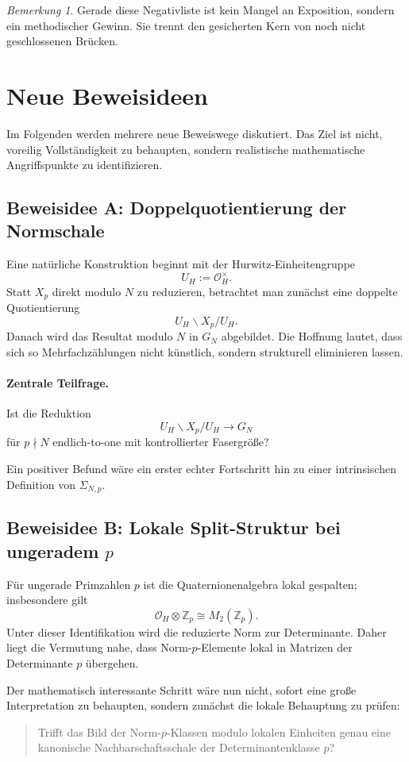 \documentclass[12pt,a4paper]{article}
\theoremstyle{plain}
\theoremstyle{definition}
\theoremstyle{remark}
\newtheorem{bemerkung}[satz]{Bemerkung}
\newcommand{\Z}{\mathbb{Z}}
\newcommand{\OH}{\mathcal{O}_H}
\begin{document}
	\begin{bemerkung}
		Gerade diese Negativliste ist kein Mangel an Exposition, sondern ein methodischer Gewinn. Sie trennt den gesicherten Kern von noch nicht geschlossenen Brücken.
	\end{bemerkung}
	
	\section{Neue Beweisideen}
	Im Folgenden werden mehrere neue Beweiswege diskutiert. Das Ziel ist nicht, voreilig Vollständigkeit zu behaupten, sondern realistische mathematische Angriffspunkte zu identifizieren.
	
	\subsection{Beweisidee A: Doppelquotientierung der Normschale}
	Eine natürliche Konstruktion beginnt mit der Hurwitz-Einheitengruppe
	\[
	U_H:=\OH^\times.
	\]
	Statt $X_p$ direkt modulo $N$ zu reduzieren, betrachtet man zunächst eine doppelte Quotientierung
	\[
	U_H\backslash X_p/U_H.
	\]
	Danach wird das Resultat modulo $N$ in $G_N$ abgebildet. Die Hoffnung lautet, dass sich so Mehrfachzählungen nicht künstlich, sondern strukturell eliminieren lassen.
	
	\paragraph{Zentrale Teilfrage.}
	Ist die Reduktion
	\[
	U_H\backslash X_p/U_H \longrightarrow G_N
	\]
	für $p\nmid N$ endlich-to-one mit kontrollierter Fasergröße?
	
	Ein positiver Befund wäre ein erster echter Fortschritt hin zu einer intrinsischen Definition von $\Sigma_{N,p}$.
	
	\subsection{Beweisidee B: Lokale Split-Struktur bei ungeradem $p$}
	Für ungerade Primzahlen $p$ ist die Quaternionenalgebra lokal gespalten; insbesondere gilt
	\[
	\OH\otimes \Z_p \cong M_2(\Z_p).
	\]
	Unter dieser Identifikation wird die reduzierte Norm zur Determinante. Daher liegt die Vermutung nahe, dass Norm-$p$-Elemente lokal in Matrizen der Determinante $p$ übergehen.
	
	Der mathematisch interessante Schritt wäre nun nicht, sofort eine große Interpretation zu behaupten, sondern zunächst die lokale Behauptung zu prüfen:
	\begin{quote}
		Trifft das Bild der Norm-$p$-Klassen modulo lokalen Einheiten genau eine kanonische Nachbarschaftsschale der Determinantenklasse $p$?
	\end{quote}
	
\end{document}
